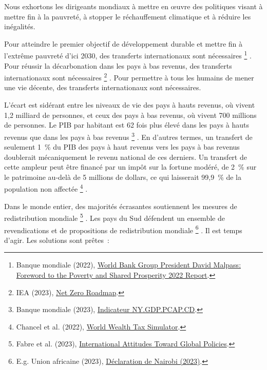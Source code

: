 \documentclass[a5paper,french]{memoir}
\begin{document}
Nous exhortons les dirigeants mondiaux à mettre en œuvre des politiques visant à mettre fin à la pauvreté, à stopper le réchauffement climatique et à réduire les inégalités. 

Pour atteindre le premier objectif de développement durable et mettre fin à l'extrême pauvreté d'ici 2030, des transferts internationaux sont nécessaires
\footnote{Banque mondiale (2022), \href{https://www.worldbank.org/en/news/statement/2022/10/05/world-bank-group-president-david-malpass-foreword-to-the-poverty-and-shared-prosperity-report}{World Bank Group President David Malpass: Foreword to the Poverty and Shared Prosperity 2022 Report}.}%
. Pour réussir la décarbonation dans les pays à bas revenus, des transferts internationaux sont nécessaires
\footnote{IEA (2023), \href{https://www.iea.org/reports/net-zero-roadmap-a-global-pathway-to-keep-the-15-0c-goal-in-reach/}{Net Zero Roadmap}.}%
. Pour permettre à tous les humains de mener une vie décente, des transferts internationaux sont nécessaires. 

L'écart est sidérant entre les niveaux de vie des pays à hauts revenus, où vivent 1,2 milliard de personnes, et ceux des pays à bas revenus, où vivent 700 millions de personnes. Le PIB par habitant est 62 fois plus élevé dans les pays à hauts revenus que dans les pays à bas revenus
\footnote{Banque mondiale (2023), \href{https://data.worldbank.org/indicator/NY.GDP.PCAP.CD?end=2021\&locations=EU-ZG-XD-XM-1W-IN-US-CD-BI-LU-CN\&start=2021\&view=bar}{Indicateur NY.GDP.PCAP.CD}.}%
. En d'autres termes, un transfert de seulement 1~\% du PIB des pays à haut revenus vers les pays à bas revenus doublerait mécaniquement le revenu national de ces derniers. Un transfert de cette ampleur peut être financé par un impôt sur la fortune modéré, de 2~\% sur le patrimoine au-delà de 5 millions de dollars, ce qui laisserait 99,9~\% de la population non affectée
\footnote{Chancel et al. (2022), \href{https://wid.world/world-wealth-tax-simulator/}{World Wealth Tax Simulator}.}%
.

Dans le monde entier, des majorités écrasantes soutiennent les mesures de redistribution mondiale
\footnote{Fabre et al. (2023), \href{https://papers.ssrn.com/sol3/papers.cfm?abstract\_id=4448523}{International Attitudes Toward Global Policies}.}%
. Les pays du Sud défendent un ensemble de revendications et de propositions de redistribution mondiale
\footnote{E.g. Union africaine (2023), \href{https://media.africaclimatesummit.org/NAIROBI+Declaration+FURTHER+edited+060923+EN+920AM.pdf}{Déclaration de Nairobi (2023)}.}%
. Il est temps d'agir. Les solutions sont prêtes~:
\end{document}
